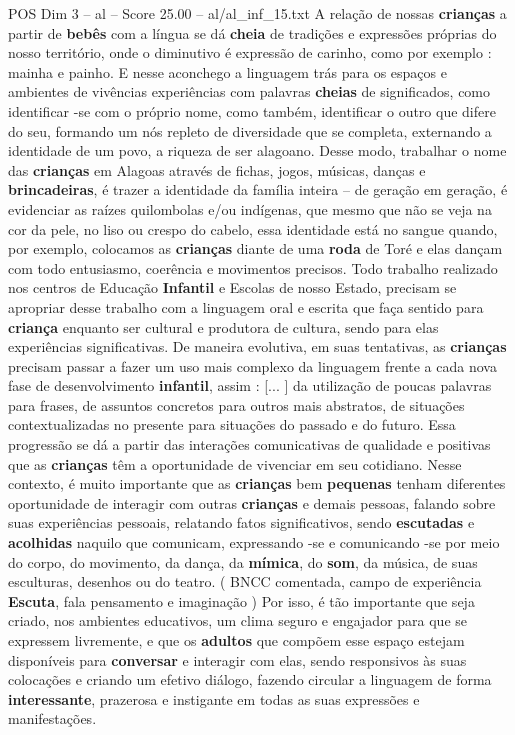 \begin{textsample}{POS Dim 3 – al – Score 25.00 – al/al\_inf\_15.txt}
A relação de nossas \textbf{crianças} a partir de \textbf{bebês} com a língua se dá \textbf{cheia} de tradições e expressões próprias do nosso território, onde o diminutivo é expressão de carinho, como por exemplo : mainha e painho.
E nesse aconchego a linguagem trás para os espaços e ambientes de vivências experiências com palavras \textbf{cheias} de significados, como identificar -se com o próprio nome, como também, identificar o outro que difere do seu, formando um nós repleto de diversidade que se completa, externando a identidade de um povo, a riqueza de ser alagoano.
Desse modo, trabalhar o nome das \textbf{crianças} em Alagoas através de fichas, jogos, músicas, danças e \textbf{brincadeiras}, é trazer a identidade da família inteira – de geração em geração, é evidenciar as raízes quilombolas e/ou indígenas, que mesmo que não se veja na cor da pele, no liso ou crespo do cabelo, essa identidade está no sangue quando, por exemplo, colocamos as \textbf{crianças} diante de uma \textbf{roda} de Toré e elas dançam com todo entusiasmo, coerência e movimentos precisos.
Todo trabalho realizado nos centros de Educação \textbf{Infantil} e Escolas de nosso Estado, precisam se apropriar desse trabalho com a linguagem oral e escrita que faça sentido para \textbf{criança} enquanto ser cultural e produtora de cultura, sendo para elas experiências significativas.
De maneira evolutiva, em suas tentativas, as \textbf{crianças} precisam passar a fazer um uso mais complexo da linguagem frente a cada nova fase de desenvolvimento \textbf{infantil}, assim : [... ] da utilização de poucas palavras para frases, de assuntos concretos para outros mais abstratos, de situações contextualizadas no presente para situações do passado e do futuro.
Essa progressão se dá a partir das interações comunicativas de qualidade e positivas que as \textbf{crianças} têm a oportunidade de vivenciar em seu cotidiano.
Nesse contexto, é muito importante que as \textbf{crianças} bem \textbf{pequenas} tenham diferentes oportunidade de interagir com outras \textbf{crianças} e demais pessoas, falando sobre suas experiências pessoais, relatando fatos significativos, sendo \textbf{escutadas} e \textbf{acolhidas} naquilo que comunicam, expressando -se e comunicando -se por meio do corpo, do movimento, da dança, da \textbf{mímica}, do \textbf{som}, da música, de suas esculturas, desenhos ou do teatro. ( BNCC comentada, campo de experiência \textbf{Escuta}, fala pensamento e imaginação ) Por isso, é tão importante que seja criado, nos ambientes educativos, um clima seguro e engajador para que se expressem livremente, e que os \textbf{adultos} que compõem esse espaço estejam disponíveis para \textbf{conversar} e interagir com elas, sendo responsivos às suas colocações e criando um efetivo diálogo, fazendo circular a linguagem de forma \textbf{interessante}, prazerosa e instigante em todas as suas expressões e manifestações.

\end{textsample}
